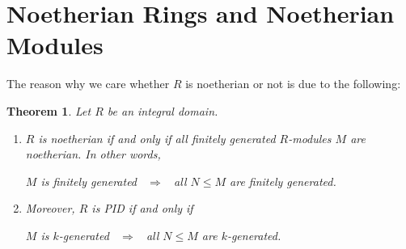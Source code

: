 \documentclass[12pt]{amsbook}
\newtheorem{theorem}{Theorem}[section]
\begin{document}
\section{Noetherian Rings and Noetherian Modules}
The reason why we care whether $R$ is noetherian or not is due to the following:
\begin{theorem}
    Let $R$ be an integral domain.
    \begin{enumerate}
        \item $R$ is noetherian if and only if all finitely generated $R$-modules $M$ are noetherian. In other words,
        \begin{center}
        $M$ is finitely generated \ $\Rightarrow$ \ all $N\leq M$ are finitely generated.    
        \end{center}
        \item Moreover, $R$ is PID if and only if
        \begin{center}
        $M$ is $k$-generated \ $\Rightarrow$ \ all $N\leq M$ are $k$-generated.    
        \end{center}
    \end{enumerate}
\end{theorem}
\end{document}
